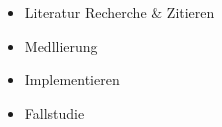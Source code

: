 


\begin{itemize}
    \item Literatur Recherche & Zitieren
    \item Medllierung
    \item Implementieren
    \item Fallstudie
\end{itemize}



